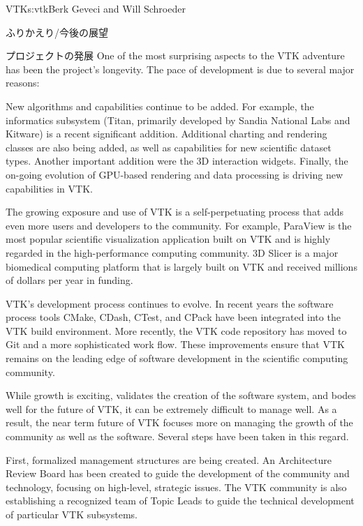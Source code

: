 \begin{aosachapter}{VTK}{s:vtk}{Berk Geveci and Will Schroeder}
\begin{aosasect1}{ふりかえり/今後の展望}
\begin{aosasect2}{プロジェクトの発展}
One of the most surprising aspects to the VTK adventure has been the
project's longevity. The pace of development is due to several major
reasons:

\begin{aosaitemize}

  \item New algorithms and capabilities continue to be added. For
  example, the informatics subsystem (Titan, primarily developed by
  Sandia National Labs and Kitware) is a recent significant
  addition. Additional charting and rendering classes are also being
  added, as well as capabilities for new scientific dataset
  types. Another important addition were the 3D interaction
  widgets. Finally, the on-going evolution of GPU-based rendering and
  data processing is driving new capabilities in VTK.

  \item The growing exposure and use of VTK is a self-perpetuating
  process that adds even more users and developers to the
  community. For example, ParaView is the most popular scientific
  visualization application built on VTK and is highly regarded in the
  high-performance computing community. 3D Slicer is a major
  biomedical computing platform that is largely built on VTK and
  received millions of dollars per year in funding.

  \item VTK's development process continues to evolve. In recent years
  the software process tools CMake, CDash, CTest, and CPack have been
  integrated into the VTK build environment. More recently, the VTK
  code repository has moved to Git and a more sophisticated work
  flow. These improvements ensure that VTK remains on the leading edge
  of software development in the scientific computing community.

\end{aosaitemize}

While growth is exciting, validates the creation of the software
system, and bodes well for the future of VTK, it can be extremely
difficult to manage well. As a result, the near term future of VTK
focuses more on managing the growth of the community as well as the
software. Several steps have been taken in this regard.

First, formalized management structures are being created. An
Architecture Review Board has been created to guide the development of
the community and technology, focusing on high-level, strategic
issues. The VTK community is also establishing a recognized team of
Topic Leads to guide the technical development of particular VTK
subsystems.


\end{aosasect2}
\end{aosasect1}
\end{aosachapter}
